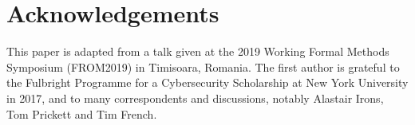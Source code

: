 \documentclass{llncs}
\begin{document}
\section*{Acknowledgements}

This paper is adapted from a talk given at the 2019 Working Formal Methods Symposium (FROM2019) in Timisoara, Romania. The first author is grateful to the Fulbright Programme for a Cybersecurity Scholarship at New York University in 2017, and to many correspondents and discussions, notably Alastair Irons, Tom Prickett and Tim French.

% 



\end{document}
